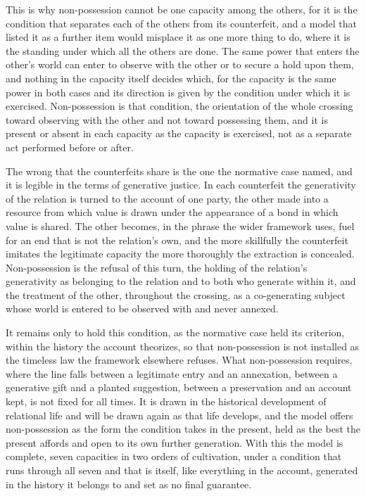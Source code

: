 This is why non-possession cannot be one capacity among the others, for it is the condition that separates each of the others from its counterfeit, and a model that listed it as a further item would misplace it as one more thing to do, where it is the standing under which all the others are done. The same power that enters the other's world can enter to observe with the other or to secure a hold upon them, and nothing in the capacity itself decides which, for the capacity is the same power in both cases and its direction is given by the condition under which it is exercised. Non-possession is that condition, the orientation of the whole crossing toward observing with the other and not toward possessing them, and it is present or absent in each capacity as the capacity is exercised, not as a separate act performed before or after.

The wrong that the counterfeits share is the one the normative case named, and it is legible in the terms of generative justice. In each counterfeit the generativity of the relation is turned to the account of one party, the other made into a resource from which value is drawn under the appearance of a bond in which value is shared. The other becomes, in the phrase the wider framework uses, fuel for an end that is not the relation's own, and the more skillfully the counterfeit imitates the legitimate capacity the more thoroughly the extraction is concealed. Non-possession is the refusal of this turn, the holding of the relation's generativity as belonging to the relation and to both who generate within it, and the treatment of the other, throughout the crossing, as a co-generating subject whose world is entered to be observed with and never annexed.

It remains only to hold this condition, as the normative case held its criterion, within the history the account theorizes, so that non-possession is not installed as the timeless law the framework elsewhere refuses. What non-possession requires, where the line falls between a legitimate entry and an annexation, between a generative gift and a planted suggestion, between a preservation and an account kept, is not fixed for all times. It is drawn in the historical development of relational life and will be drawn again as that life develops, and the model offers non-possession as the form the condition takes in the present, held as the best the present affords and open to its own further generation. With this the model is complete, seven capacities in two orders of cultivation, under a condition that runs through all seven and that is itself, like everything in the account, generated in the history it belongs to and set as no final guarantee.

